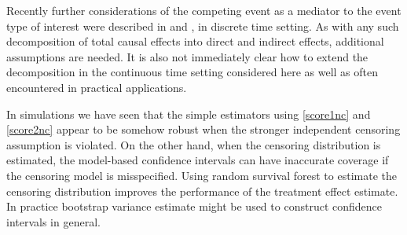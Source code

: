 \documentclass[11pt]{article}
\begin{document}
Recently further considerations of the competing event as a mediator to the event type of interest were described in  %
 \cite{young:etal:2020} and \cite{stensrud2020separable}, in discrete time setting. 
 As with any such decomposition of total causal effects into direct and indirect effects, additional assumptions are needed. It is also not immediately clear how to extend the decomposition in the continuous time setting considered here as well as often encountered in practical applications. 

In simulations we have seen that the simple estimators using \eqref{score1nc} and \eqref{score2nc} appear  to be somehow robust  when the stronger independent censoring assumption is violated. On the other hand, 
when the censoring distribution is estimated, the model-based confidence intervals can have 
inaccurate coverage if the censoring model is misspecified. 
Using random survival forest to estimate the censoring distribution improves the performance of the treatment effect estimate. 
In practice 
bootstrap variance estimate might be used to construct confidence intervals in general.
\end{document}
